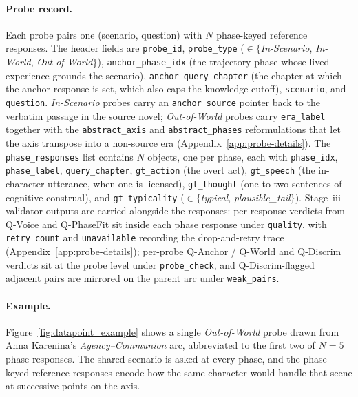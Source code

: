 \documentclass[11pt]{article}
\begin{document}
\paragraph{Probe record.}
Each probe pairs one (scenario, question) with $N$ phase-keyed reference responses. The header fields are \texttt{probe\_id}, \texttt{probe\_type} ($\in\{$\emph{In-Scenario}, \emph{In-World}, \emph{Out-of-World}$\}$), \texttt{anchor\_phase\_idx} (the trajectory phase whose lived experience grounds the scenario), \texttt{anchor\_query\_chapter} (the chapter at which the anchor response is set, which also caps the knowledge cutoff), \texttt{scenario}, and \texttt{question}. \emph{In-Scenario} probes carry an \texttt{anchor\_source} pointer back to the verbatim passage in the source novel; \emph{Out-of-World} probes carry \texttt{era\_label} together with the \texttt{abstract\_axis} and \texttt{abstract\_phases} reformulations that let the axis transpose into a non-source era (Appendix~\ref{app:probe-details}). The \texttt{phase\_responses} list contains $N$ objects, one per phase, each with \texttt{phase\_idx}, \texttt{phase\_label}, \texttt{query\_chapter}, \texttt{gt\_action} (the overt act), \texttt{gt\_speech} (the in-character utterance, when one is licensed), \texttt{gt\_thought} (one to two sentences of cognitive construal), and \texttt{gt\_typicality} ($\in\{$\emph{typical}, \emph{plausible\_tail}$\}$). Stage~iii validator outputs are carried alongside the responses: per-response verdicts from Q-Voice and Q-PhaseFit sit inside each phase response under \texttt{quality}, with \texttt{retry\_count} and \texttt{unavailable} recording the drop-and-retry trace (Appendix~\ref{app:probe-details}); per-probe Q-Anchor / Q-World and Q-Discrim verdicts sit at the probe level under \texttt{probe\_check}, and Q-Discrim-flagged adjacent pairs are mirrored on the parent arc under \texttt{weak\_pairs}.

\paragraph{Example.}
Figure~\ref{fig:datapoint_example} shows a single \emph{Out-of-World} probe drawn from Anna Karenina's \emph{Agency--Communion} arc, abbreviated to the first two of $N{=}5$ phase responses. The shared scenario is asked at every phase, and the phase-keyed reference responses encode how the same character would handle that scene at successive points on the axis.
\end{document}
